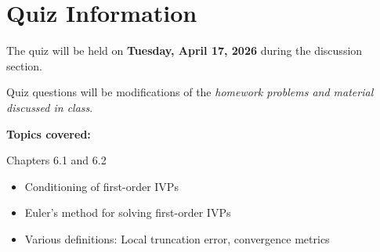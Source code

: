 \documentclass[reqno]{exam}
\begin{document}
\section*{Quiz Information}

The quiz will be held on {\bf Tuesday, April 17, 2026} during the discussion section.

Quiz questions will be modifications of the {\it homework problems and material discussed in class}.

\textbf{Topics covered:}

Chapters 6.1 and 6.2

\begin{itemize}
  \item Conditioning of first-order IVPs
  \item Euler's method for solving first-order IVPs
  \item Various definitions: Local truncation error, convergence metrics
\end{itemize}
\end{document}
